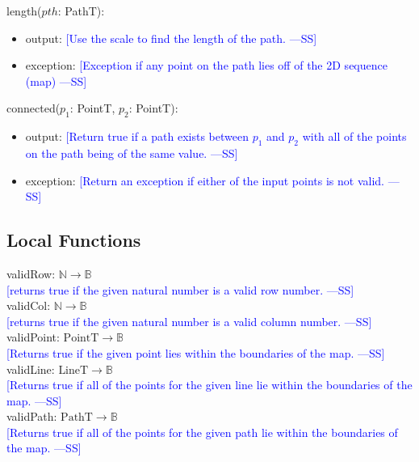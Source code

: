 \documentclass[12pt]{article}
\newcommand{\authornote}[3]{\textcolor{#1}{[#3 ---#2]}}
\newcommand{\authornote}[3]{}
\newcommand{\wss}[1]{\authornote{blue}{SS}{#1}}
\begin{document}
\noindent length($\mathit{pth}$: PathT):
\begin{itemize}
\item output: \wss{Use the scale to find the length of the
    path.}
\item exception: \wss{Exception if any point on the path lies off of the 2D
    sequence (map)}
\end{itemize}

\noindent connected($p_1$: PointT, $p_2$: PointT):
\begin{itemize}
\item output: \wss{Return true if a path exists between $p_1$ and $p_2$ with all
    of the points on the path being of the same value.}
\item exception: \wss{Return an exception if either of the input points is not
    valid.}

\end{itemize}

\subsection*{Local Functions}

\noindent validRow: $\mathbb{N} \rightarrow \mathbb{B}$\\
\noindent \wss{returns true if the given natural number is a valid row
  number.}\\

\noindent validCol: $\mathbb{N} \rightarrow \mathbb{B}$\\
\noindent \wss{returns true if the given natural number is a valid column
  number.}\\

\noindent validPoint: $\mbox{PointT} \rightarrow \mathbb{B}$\\
\noindent \wss{Returns true if the given point lies within the boundaries of the
  map.}\\

\noindent validLine: $\mbox{LineT} \rightarrow \mathbb{B}$\\
\noindent \wss{Returns true if all of the points for the given line lie within the boundaries of the
  map.}\\

\noindent validPath: $\mbox{PathT} \rightarrow \mathbb{B}$\\
\noindent \wss{Returns true if all of the points for the given path lie within the boundaries of the
  map.}\\
\end{document}
